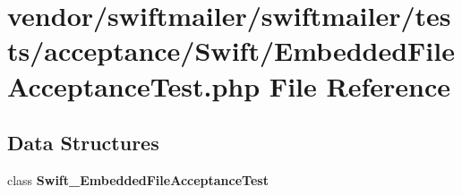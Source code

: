\section{vendor/swiftmailer/swiftmailer/tests/acceptance/\+Swift/\+Embedded\+File\+Acceptance\+Test.php File Reference}
\label{_embedded_file_acceptance_test_8php}
\subsection*{Data Structures}
\begin{DoxyCompactItemize}
\item 
class {\bf Swift\+\_\+\+Embedded\+File\+Acceptance\+Test}
\end{DoxyCompactItemize}
